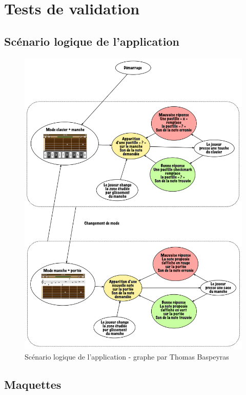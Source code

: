 \documentclass{scrreprt}
\begin{document}
\chapter{Tests de validation}

\section{Scénario logique de l'application}

\begin{figure}[!h]
        \centering
        \includegraphics[width=15cm]{images/scenario_balezator.png}
        \caption{Scénario logique de l'application - graphe par Thomas Baspeyras}
        \label{fig:scenarios}
\end{figure}

\section{Maquettes}
\end{document}
